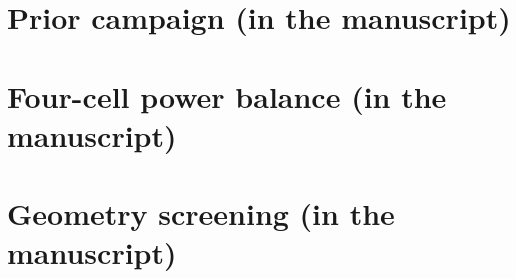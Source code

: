 \documentclass[11pt]{article}
\begin{document}
\section{Prior campaign (in the manuscript)}\label{sec:mdo-l0}
\section{Four-cell power balance (in the manuscript)}\label{sec:four-cell-closure}
\section{Geometry screening (in the manuscript)}\label{sec:wall-loss-geometry-screening}

\end{document}
